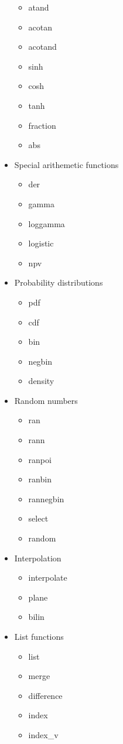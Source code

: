 \begin{itemize}
\begin{itemize}
\item atand
\item acotan
\item acotand
\item sinh
\item cosh
\item tanh
\item fraction
\item abs
\end{itemize}
\item  Special arithemetic functions
\begin{itemize}
\item der
\item gamma
\item loggamma
\item logistic
\item npv
\end{itemize}
\item  Probability distributions
\begin{itemize}
\item pdf
\item cdf
\item bin
\item negbin
\item density
\end{itemize}
\item Random numbers
\begin{itemize}
\item ran
\item rann
\item ranpoi
\item ranbin
\item rannegbin
\item select
\item random
\end{itemize}
\item Interpolation
\begin{itemize}
\item interpolate
\item plane
\item bilin
\end{itemize}
\item  List functions
\begin{itemize}
\item  list
\item merge
\item difference
\item index
\item index\_v

\end{itemize}
\end{itemize}
